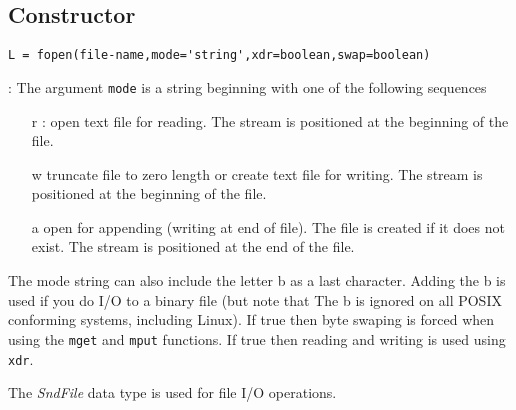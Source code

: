 
\begin{mandesc}
\end{mandesc}

\subsection*{Constructor}
\begin{verbatim}
L = fopen(file-name,mode='string',xdr=boolean,swap=boolean)
\end{verbatim}
\begin{parameters}
  \begin{varlist}
    : The argument \verb+mode+ is a string beginning  with  one  of  the  following  sequences
    \begin{itemize}
      \item[r]: open text file for reading. The stream is positioned at the beginning of the
        file.
      \item[w] truncate  file  to  zero  length  or create text file for writing.  The stream is
        positioned at the beginning of the file.
      \item[a] open for appending (writing at end of file).  The file is created if it does not 
	exist.  The stream is positioned at the end of the file.
    \end{itemize}
    The mode string can also include the letter b as a last character. 
    Adding the b is used if you do I/O to a binary file 
    (but note that The b is ignored on all POSIX conforming systems, including Linux).
     If true then byte swaping is forced when using the \verb+mget+ and 
    \verb+mput+ functions. 
     If true then reading and writing is used using \verb+xdr+.
  \end{varlist}
\end{parameters}

\begin{mandescription}
The \emph{SndFile} data type is used for file I/O operations.
\end{mandescription}

